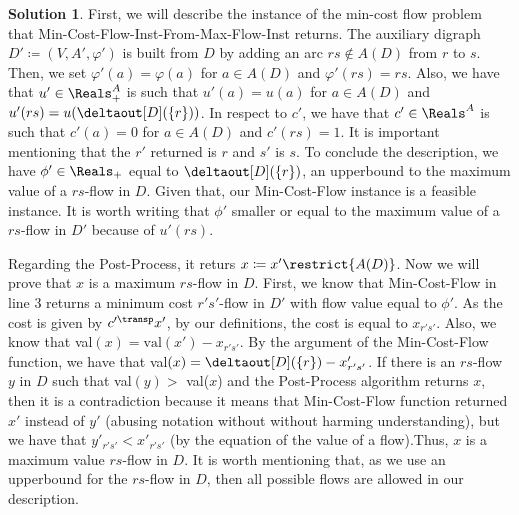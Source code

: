 \documentclass[11pt,leqno,final]{amsart}
\theoremstyle{definition}
\newtheorem{solution}{Solution}
\begin{document}
\begin{solution}
  First, we will describe the instance of the min-cost flow problem that Min-Cost-Flow-Inst-From-Max-Flow-Inst returns. The auxiliary digraph $D' \coloneqq (V, A', \varphi')$ is built from $D$ by adding an arc $rs \notin A(D)$ from $r$ to $s$. Then, we set $\varphi'(a) = \varphi(a)$ for $a \in A(D)$ and $\varphi'(rs) = rs$. Also, we have that $u' \in \Reals^{A}_{+}$ is such that $u'(a) = u(a)$ for $a \in A(D)$ and $u'(rs) = u(\deltaout[D](\{r\}))$. In respect to $c'$, we have that $c' \in \Reals^{A}$ is such that $c'(a) = 0$ for $a \in A(D)$ and $c'(rs) = 1$. It is important mentioning that the $r'$ returned is $r$ and $s'$ is $s$. To conclude the description, we have $\phi' \in \Reals_{+}$ equal to $\deltaout[D](\{r\})$, an upperbound to the maximum value of a $rs$-flow in $D$. Given that, our Min-Cost-Flow instance is a feasible instance. It is worth writing that $\phi'$ smaller or equal to the maximum value of a $rs$-flow in $D'$ because of $u'(rs)$.

  Regarding the Post-Process, it returs $x \coloneqq x'\restrict{A(D)}$. Now we will prove that $x$ is a maximum $rs$-flow in $D$. First, we know that Min-Cost-Flow in line 3 returns a minimum cost $r's'$-flow in $D'$ with flow value equal to $\phi'$. As the cost is given by $c'^{\transp} x'$, by our definitions, the cost is equal to $x_{r's'}$. Also, we know that val$(x) = \text{val}(x') - x_{r's'}$. By the argument of the Min-Cost-Flow function, we have that val$(x) = \deltaout[D](\{r\}) - x'_{r's'}$. If there is an $rs$-flow $y$ in $D$ such that val$(y) >$ val($x$) and the Post-Process algorithm returns $x$, then it is a contradiction because it means that Min-Cost-Flow function returned $x'$ instead of $y'$ (abusing notation without without harming understanding), but we have that $y'_{r's'} < x'_{r's'}$ (by the equation of the value of a flow).Thus, $x$ is a maximum value $rs$-flow in $D$. It is worth mentioning that, as we use an upperbound for the $rs$-flow in $D$, then all possible flows are allowed in our description.

\end{solution}
\end{document}
